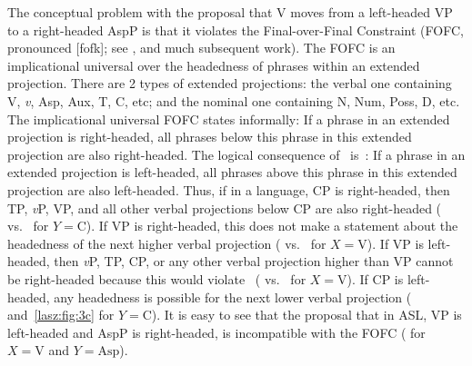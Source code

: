 \documentclass[output=paper]{langscibook}
\begin{document}
The conceptual problem with the proposal that V moves from a
left-headed VP to a right-headed AspP is that it violates the
Final-over-Final Constraint (FOFC, pronounced [fofk]; see 
\citealp{BiberauerHR.2014,SheehanBRH.2017}, and much subsequent work). The
FOFC is an implicational universal over the headedness of phrases
within an extended projection. There are 2 types of extended
projections: the verbal one containing V, \textit{v}, Asp, Aux, T, C, etc; and
the nominal one containing N, Num, Poss, D, etc. The implicational
universal FOFC states informally:
\ea 
    \label{lasz:ex:28}
     If a phrase in an extended projection is right-headed, all
    phrases below this phrase in this extended projection are also
    right-headed. \citep[after][]{BiberauerHR.2014}
\z 
The logical consequence of~ is~:
\ea 
    \label{lasz:ex:29}
    If a phrase in an extended projection is left-headed, all
    phrases above this phrase in this extended projection are also
    left-headed.
\z 
Thus, if in a language, CP is right-headed, then TP, \textit{v}P, VP, and all
other verbal projections below CP are also right-headed ( vs.~
for $Y=\text{C}$). If VP is right-headed, this does not make a statement about
the headedness of the next higher verbal projection ( vs.~ for
$X=\text{V}$). If VP is left-headed, then \textit{v}P, TP, CP, or any other verbal
projection higher than VP cannot be right-headed because this would
violate~ ( vs.~ for $X=\text{V}$). If CP is left-headed, any
headedness is possible for the next lower verbal projection (
and~\ref{lasz:fig:3c} for $Y=\text{C}$). It is easy to see that the proposal that in ASL, VP is
left-headed and AspP is right-headed, is incompatible with the FOFC
( for $X=\text{V}$ and $Y=\text{Asp}$).
\end{document}
